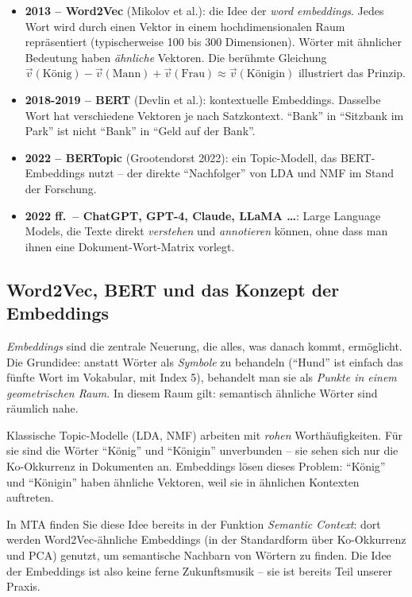 \documentclass[a4paper,11pt]{article}
\begin{document}
\begin{itemize}
\item \textbf{2013 -- Word2Vec} (Mikolov et al.): die Idee der
\emph{word embeddings}. Jedes Wort wird durch einen Vektor in einem
hochdimensionalen Raum repräsentiert (typischerweise 100 bis 300
Dimensionen). Wörter mit ähnlicher Bedeutung haben \emph{ähnliche}
Vektoren. Die berühmte Gleichung
$\vec{v}(\text{König}) - \vec{v}(\text{Mann}) + \vec{v}(\text{Frau})
\approx \vec{v}(\text{Königin})$
illustriert das Prinzip.

\item \textbf{2018-2019 -- BERT} (Devlin et al.): kontextuelle
Embeddings. Dasselbe Wort hat verschiedene Vektoren je nach Satzkontext.
\enquote{Bank} in \enquote{Sitzbank im Park} ist nicht
\enquote{Bank} in \enquote{Geld auf der Bank}.

\item \textbf{2022 -- BERTopic} (Grootendorst 2022): ein
Topic-Modell, das BERT-Embeddings nutzt -- der direkte
\enquote{Nachfolger} von LDA und NMF im Stand der Forschung.

\item \textbf{2022 ff.\ -- ChatGPT, GPT-4, Claude, LLaMA \dots}: Large
Language Models, die Texte direkt \emph{verstehen} und
\emph{annotieren} können, ohne dass man ihnen eine
Dokument-Wort-Matrix vorlegt.
\end{itemize}

\subsection{Word2Vec, BERT und das Konzept der Embeddings}

\emph{Embeddings} sind die zentrale Neuerung, die alles, was danach
kommt, ermöglicht. Die Grundidee: anstatt Wörter als \emph{Symbole}
zu behandeln (\enquote{Hund} ist einfach das fünfte Wort im Vokabular,
mit Index 5), behandelt man sie als \emph{Punkte in einem geometrischen
Raum}. In diesem Raum gilt: semantisch ähnliche Wörter sind räumlich
nahe.

Klassische Topic-Modelle (LDA, NMF) arbeiten mit \emph{rohen}
Worthäufigkeiten. Für sie sind die Wörter \enquote{König} und
\enquote{Königin} unverbunden -- sie sehen sich nur die Ko-Okkurrenz
in Dokumenten an. Embeddings lösen dieses Problem: \enquote{König}
und \enquote{Königin} haben ähnliche Vektoren, weil sie in ähnlichen
Kontexten auftreten.

In MTA finden Sie diese Idee bereits in der Funktion \emph{Semantic
Context}: dort werden Word2Vec-ähnliche Embeddings (in der Standardform
über Ko-Okkurrenz und PCA) genutzt, um semantische Nachbarn von Wörtern
zu finden. Die Idee der Embeddings ist also keine ferne
Zukunftsmusik -- sie ist bereits Teil unserer Praxis.
\end{document}
